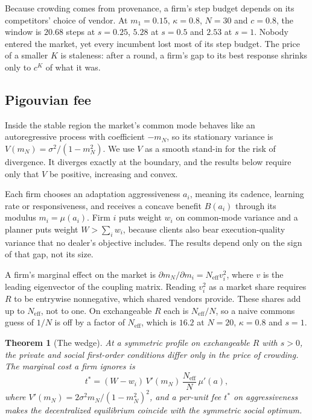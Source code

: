 \documentclass[conference]{IEEEtran}
\theoremstyle{plain}
\newtheorem{theorem}{Theorem}
\newcommand{\Neff}{N_{\mathrm{eff}}}
\newcommand{\mN}{m_N}
\begin{document}
Because crowding comes from provenance, a firm's step budget depends on its competitors' choice of vendor. At $m_1=0.15$, $\kappa=0.8$, $N=30$ and $c=0.8$, the window is $20.68$ steps at $s=0.25$, $5.28$ at $s=0.5$ and $2.53$ at $s=1$. Nobody entered the market, yet every incumbent lost most of its step budget. The price of a smaller $K$ is staleness: after a round, a firm's gap to its best response shrinks only to $c^K$ of what it was.

\subsection{Pigouvian fee}
Inside the stable region the market's common mode behaves like an autoregressive process with coefficient $-\mN$, so its stationary variance is $V(\mN)=\sigma^2/(1-\mN^2)$. We use $V$ as a smooth stand-in for the risk of divergence. It diverges exactly at the boundary, and the results below require only that $V$ be positive, increasing and convex.

Each firm chooses an adaptation aggressiveness $a_i$, meaning its cadence, learning rate or responsiveness, and receives a concave benefit $B(a_i)$ through its modulus $m_i=\mu(a_i)$. Firm $i$ puts weight $w_i$ on common-mode variance and a planner puts weight $W>\sum_iw_i$, because clients also bear execution-quality variance that no dealer's objective includes. The results depend only on the sign of that gap, not its size.

A firm's marginal effect on the market is $\partial\mN/\partial m_i=\Neff v_i^2$, where $v$ is the leading eigenvector of the coupling matrix. Reading $v_i^2$ as a market share requires $R$ to be entrywise nonnegative, which shared vendors provide. These shares add up to $\Neff$, not to one. On exchangeable $R$ each is $\Neff/N$, so a naive commons guess of $1/N$ is off by a factor of $\Neff$, which is $16.2$ at $N=20$, $\kappa=0.8$ and $s=1$.

\begin{theorem}[The wedge]
\label{thm:wedge}
At a symmetric profile on exchangeable $R$ with $s>0$, the private and social first-order conditions differ only in the price of crowding. The marginal cost a firm ignores is
\begin{equation}
t^*=(W-w_i)\,V'(\mN)\,\frac{\Neff}{N}\,\mu'(a),
\end{equation}
where $V'(\mN)=2\sigma^2\mN/(1-\mN^2)^2$, and a per-unit fee $t^*$ on aggressiveness makes the decentralized equilibrium coincide with the symmetric social optimum.
\end{theorem}
\end{document}
